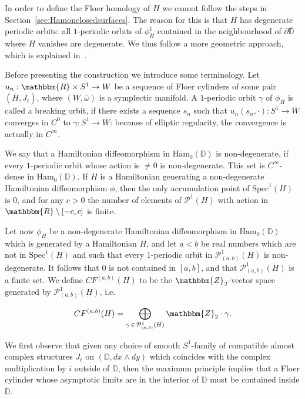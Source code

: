 \documentclass[AHL,Unicode,longabstracts,published]{cedram}
\newcommand{\Z}{\mathbbm{Z}}
\newcommand{\R}{\mathbbm{R}}
\newcommand{\D}{\mathbb{D}}
\newcommand{\Ham}{\mathrm{Ham}}
\newcommand{\Spec}{\mathrm{Spec}}
\newcommand{\clP}{\mathcal{P}}
\begin{document}
In order to define the Floer homology of $H$ we cannot follow the steps in Section~\ref{sec:Hamonclosedsurfaces}. The reason for this is that $H$ has degenerate periodic orbits: all $1$-periodic orbits of $\phi_H^1$ contained in the neighbourhood of $\partial \overline{\D}$ where $H$ vanishes are degenerate. We thus follow a more geometric approach, which is explained in~\cite[Section~3]{Ginzburg2010}.

Before presenting the construction we introduce some terminology. Let ${u}_n:\R \times S^1 \to W $ be a sequence of Floer cylinders of some pair $(\overline{H},J_t)$, where $(W,\overline{\omega})$ is a symplectic manifold. A $1$-periodic orbit $\gamma$ of $\phi_{\overline{H}}$ is called a breaking orbit, if there exists a sequence $s_n$ such that $u_n(s_n,\cdot) : S^1 \to W$ converges in $C^0$ to $\gamma: S^1 \to W$: because of elliptic regularity, the convergence is actually in $C^\infty$.

We say that a Hamiltonian diffeomorphism in $\Ham_0(\D)$ is non-degenerate, if every $1$-periodic orbit whose action is $\neq 0$ is non-degenerate. This set is $C^\infty$-dense in $\Ham_0(\D)$. If $H$ is a Hamiltonian generating a non-degenerate Hamiltonian diffeomorphism $\phi$, then the only accumulation point of $\Spec^1(H)$ is $0$, and for any $c>0$ the number of elements of $\clP^1(H)$ with action in $\R \setminus [-c,c]$ is finite.

Let now $\phi_H$ be a non-degenerate Hamiltonian diffeomorphism in $\Ham_0(\D)$ which is generated by a Hamiltonian $H$, and let $a<b$ be real numbers which are not in $\Spec^1(H)$ and such that every $1$-periodic orbit in $\clP^1_{(a,b)}(H)$ is non-degenerate. It follows that $0$ is not contained in $[a,b]$, and that $\clP^1_{(a,b)}(H)$ is a finite set. We define $CF^{(a,b)}(H)$ to be the $\Z_2$-vector space generated by $\clP^1_{(a,b)}(H)$, i.e.

\begin{equation}
CF^{(a,b)}(H) = \bigoplus_{\gamma\,\in \,\clP^1_{(a,b)}(H)} \Z_2 \cdot \gamma.
\end{equation}

We first observe that given any choice of smooth $S^1$-family of compatible almost complex structures $J_t$ on $(\D,dx\wedge dy)$ which coincides with the complex multiplication by ${i}$ outside of $\D$, then the maximum principle implies that a Floer cylinder whose asymptotic limits are in the interior of $\D$ must be contained inside $\D$.
\end{document}
